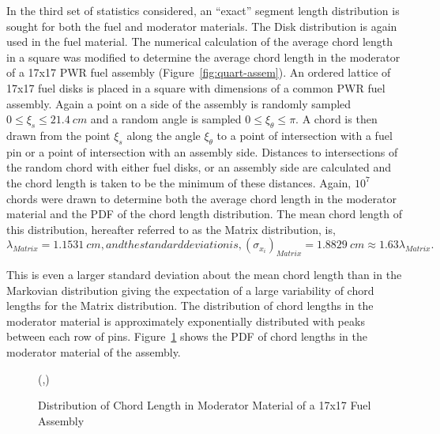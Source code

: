 \noindent
	\indent In the third set of statistics considered, an ``exact'' segment length distribution is sought for
	both the fuel and moderator materials.  The Disk distribution is again used in the fuel material.  The
	numerical calculation of the average chord length in a square was modified to determine
	the average chord length in the moderator of a 17x17 PWR fuel assembly (Figure~\ref{fig:quart-assem}).
	An ordered lattice of 17x17 fuel disks is placed in a square with dimensions of a common PWR fuel
	assembly.  Again a point on a side of the assembly is randomly sampled ${0 \le \xi_s \le 21.4 \ cm}$ and
	a random angle is sampled ${0 \le \xi_\theta \le \pi}$.  A chord is then drawn from the point ${\xi_s}$ along
	the angle ${\xi_\theta}$ to a point of intersection with a fuel pin or a point of intersection with an assembly
	side.  Distances to intersections of the random chord with either fuel disks, or an assembly side are calculated
	and the chord length is taken to be the minimum of these distances.  Again, ${10^7}$ chords were drawn to
	determine both the average chord length in the moderator material and the PDF of the chord length distribution.
	The mean chord length of this distribution, hereafter referred to as the Matrix distribution, is,
	\begin{subequations}
		\begin{equation}
			\lambda_{Matrix} = 1.1531 \ cm,
			\label{eq:Mean-Mod}	
		\end{equation}
	and the standard deviation is,
		\begin{equation}
			\left({\sigma_{x_i}}\right)_{Matrix} = 1.8829 \ cm \approx 1.63 \lambda_{Matrix}.
		\end{equation}
	\end{subequations}

\noindent This is even a larger standard deviation about the mean chord length than in the Markovian distribution
	giving the expectation of a large variability of chord lengths for the Matrix distribution. The distribution of chord
	lengths
	in the moderator material is approximately exponentially
	distributed with peaks between each row of pins.  Figure~\ref{fig:matrix}
	shows the PDF of chord lengths in the moderator material of the assembly.
		\begin{figure}[htbp]
		\begin{center}
			\begin{minipage}[t]{5.5in}
			\centering
			\begin{picture}(\width,\height)
			\end{picture}
			\caption{\label{fig:matrix}Distribution of Chord Length in Moderator Material of
				a 17x17 Fuel Assembly}
			\end{minipage} %
		\end{center}
	\end{figure}
	\vspace{-0.2in}
	
